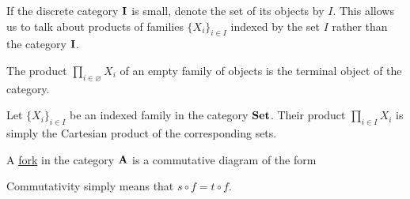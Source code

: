 \begin{note}\label{note:small_categorical_product}
  If the discrete category $\operatorname{\mathbf{I}}$ is small, denote the set of its objects by $I$. This allows us to talk about products of families $\{ X_i \}_{i \in I}$ indexed by the set $I$ rather than the category $\operatorname{\mathbf{I}}$.
\end{note}

\begin{note}\label{note:empty_categorical_product}
  The product $\prod_{i \in \varnothing} X_i$ of an empty family of objects is the terminal object of the category.
\end{note}

\begin{example}\label{ex:categorical_product/set}
  Let $\{ X_i \}_{i \in I}$ be an indexed family in the category $\operatorname{\mathbf{Set}}$. Their product $\prod_{i \in I} X_i$ is simply the Cartesian product of the corresponding sets.
\end{example}

\begin{definition}\label{def:categorical_fork}\cite[112]{Leinster2014}
  A \uline{fork} in the category $\operatorname{\mathbf{A}}$ is a commutative diagram of the form
  \begin{center}
  \end{center}

  Commutativity simply means that $s \circ f = t \circ f$.
\end{definition}

